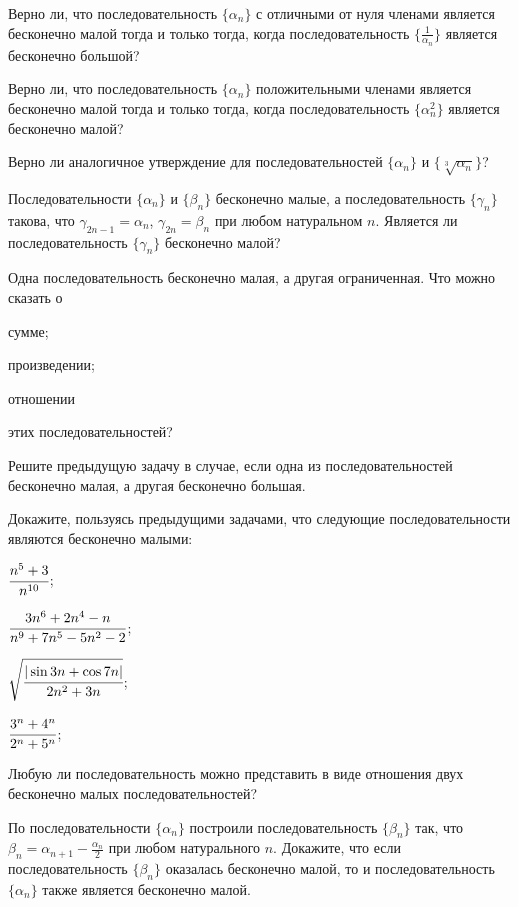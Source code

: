 \documentclass[a4paper, 12pt, num=26]{listok}
\begin{document}
\begin{problem}
	Верно ли, что последовательность $\{\alpha_n\}$ с отличными от нуля членами является бесконечно малой тогда и только тогда,
	когда последовательность $\{\frac1{\alpha_n}\}$ является бесконечно большой?
\end{problem}
\begin{problem}
\begin{probparts}
	\item Верно ли, что последовательность $\{\alpha_n\}$ положительными членами является бесконечно малой тогда и только тогда,
	когда последовательность $\{\alpha_n^2\}$ является бесконечно малой?
	\item Верно ли аналогичное утверждение для последовательностей $\{\alpha_n\}$ и $\{\sqrt[3]{\alpha_n}\}$?
\end{probparts}
\end{problem}
\begin{problem}
	Последовательности $\{\alpha_n\}$ и $\{\beta_n\}$ бесконечно малые, а последовательность $\{\gamma_n\}$ такова,
	что $\gamma_{2n-1} = \alpha_n$, $\gamma_{2n} = \beta_n$ при любом натуральном $n$.
	Является ли последовательность $\{\gamma_n\}$ бесконечно малой?
\end{problem}
\begin{problem}
	Одна последовательность бесконечно малая, а другая ограниченная.
	Что можно сказать о
	\begin{probparts}
		\item сумме;
		\item произведении;
		\item отношении
	\end{probparts}
	этих последовательностей?
\end{problem}
\begin{problem}
	Решите предыдущую задачу в случае, если одна из последовательностей бесконечно малая, а другая бесконечно большая.
\end{problem}
\begin{problem}
	Докажите, пользуясь предыдущими задачами, что следующие последовательности являются бесконечно малыми:
	\begin{multienum}{4}
		\item $\cfrac{n^5 + 3}{n^{10}}$;
		\item $\cfrac{3n^6 + 2n^4 - n}{n^9 + 7n^5 - 5n^2 - 2}$;
		\item $\sqrt{\cfrac{|\sin{3n} + \cos{7n}|}{2n^2 + 3n}}$;
		\item $\cfrac{3^n + 4^n}{2^n + 5^n}$;
	\end{multienum}
\end{problem}
\begin{problem}
	Любую ли последовательность можно представить в виде отношения двух бесконечно малых последовательностей?
\end{problem}
\begin{problem}
	По последовательности $\{\alpha_n\}$ построили последовательность $\{\beta_n\}$ так, что
	$\beta_n = \alpha_{n + 1} - \frac{\alpha_n}2$ при любом натурального $n$.
	Докажите, что если последовательность $\{\beta_n\}$ оказалась бесконечно малой,
	то и последовательность $\{\alpha_n\}$ также является бесконечно малой.
\end{problem}
\end{document}
